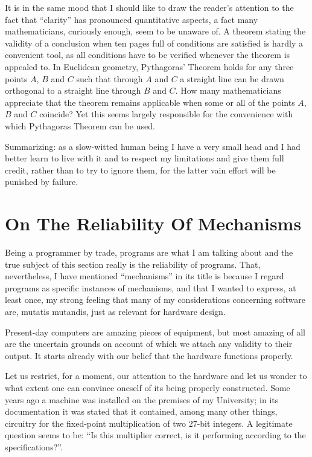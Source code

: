 \documentclass[twoside,11pt]{book}
\begin{document}
It is in the same mood that I should like to draw the reader's attention to the fact that ``clarity'' has pronounced quantitative aspects, a fact many mathematicians, curiously enough, seem to be unaware of. A theorem stating the validity of a conclusion when ten pages full of conditions are satisfied is hardly a convenient tool, as all conditions have to be verified whenever the theorem is appealed to. In Euclidean geometry, Pythagoras' Theorem holds for any three points $A$, $B$ and $C$ such that through $A$ and $C$ a straight line can be drawn orthogonal to a straight line through $B$ and $C$. How many mathematicians appreciate that the theorem remains applicable when some or all of the points $A$, $B$ and $C$ coincide? Yet this seems largely responsible for the convenience with which Pythagoras Theorem can be used.

Summarizing: as a slow-witted human being I have a very small head and I had better learn to live with it and to respect my limitations and give them full credit, rather than to try to ignore them, for the latter vain effort will be punished by failure.

\section[On the reliability of mechanisms]{On The Reliability Of Mechanisms}
\label{sec:realiability-of-mechanisms}

Being a programmer by trade, programs are what I am talking about and the true subject of this section really is the reliability of programs. That, nevertheless, I have mentioned ``mechanisms'' in its title is because I regard programs as specific instances of mechanisms, and that I wanted to express, at least once, my strong feeling that many of my considerations concerning software are, mutatis mutandis, just as relevant for hardware design.

Present-day computers are amazing pieces of equipment, but most amazing of all are the uncertain grounds on account of which we attach any validity to their output. It starts already with our belief that the hardware functions properly.

Let us restrict, for a moment, our attention to the hardware and let us wonder to what extent one can convince oneself of its being properly constructed. Some years ago a machine was installed on the premises of my University; in its documentation it was stated that it contained, among many other things, circuitry for the fixed-point multiplication of two 27-bit integers. A legitimate question seems to be: ``Is this multiplier correct, is it performing according to the specifications?''.
\end{document}
